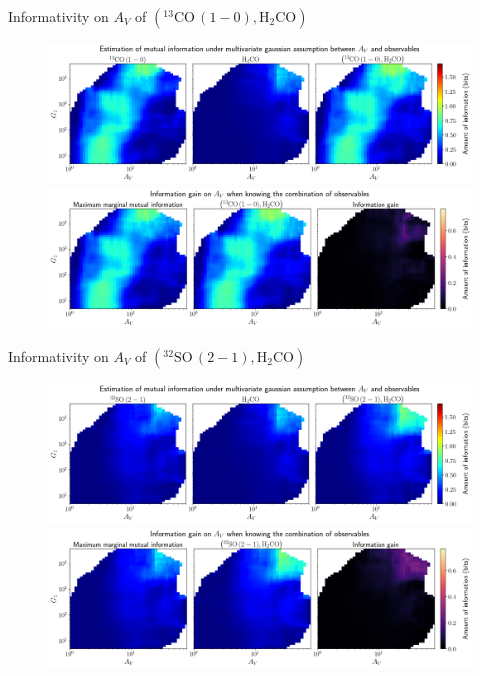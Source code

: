\documentclass{beamer}
\begin{document}
\begin{frame}{Informativity on $A_V$ of $\left(\mathrm{^{13}CO\,(1-0)},\mathrm{H_2CO}\right)$}
    \begin{figure}
        \centering
        \includegraphics[width=0.95\linewidth]{../linearinfogauss/av__13co10_h2co_linearinfogauss.png}
        \vfill
        \includegraphics[width=0.95\linewidth]{../linearinfogauss/av__13co10_h2co_linearinfogauss_gain.png}
    \end{figure}
\end{frame}

\begin{frame}{Informativity on $A_V$ of $\left(\mathrm{^{32}SO\,(2-1)},\mathrm{H_2CO}\right)$}
    \begin{figure}
        \centering
        \includegraphics[width=0.95\linewidth]{../linearinfogauss/av__32so21_h2co_linearinfogauss.png}
        \vfill
        \includegraphics[width=0.95\linewidth]{../linearinfogauss/av__32so21_h2co_linearinfogauss_gain.png}
    \end{figure}
\end{frame}
\end{document}
